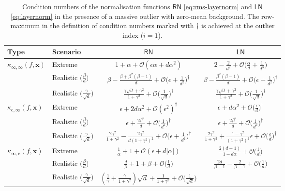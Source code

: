 \documentclass[namedate,webpdf,imanum]{ima-authoring-template}
\newcommand{\Layer}[1]{\mathsf{#1}}
\newcommand{\cond}[3][]{\kappa_{\mathrm{#2}} #1( #3 #1)}
\newcommand{\Oh}[2][]{\mathcal{O}#1( #2 #1)}
\numberwithin{equation}{section}
\begin{document}
\begin{table}[t]
\caption{Condition numbers of the normalisation functions $\Layer{RN}$ \eqref{eq:rms-layernorm} and $\Layer{LN}$ \eqref{eq:layernorm} in the presence of a massive outlier with zero-mean background.
The row-maximum in the definition of condition numbers marked with $\dagger$ is achieved at the outlier index ($i = 1$).}
\label{tab:rn_ln_zero_mean}
\begin{tabular}{@{}llcc@{}}
\toprule
Type & Scenario & $\Layer{RN}$ & $\Layer{LN}$ \\
\midrule
$\cond{\infty,\infty}{f,\mathbf{x}}$
& Extreme
& $1 + \alpha + \Oh{\epsilon\alpha + d \alpha^2}$
& $2 - \frac{2}{d^2} + \Oh[\Big]{\frac{\alpha}{d} + \frac{1}{d^3}}$ \\
%
& Realistic $\Big(\tfrac{\beta}{d}\Big)$
& $\beta - \frac{\beta + \beta^2(\beta - 1)}{d} + \Oh[\Big]{\epsilon + \frac{1}{d^2}}^\dagger$
& $\beta - \frac{\beta^2(\beta-1)}{d} + \Oh[\Big]{\epsilon + \frac{1}{d^2}}^\dagger$ \\
%
& Realistic $\Big(\tfrac{\gamma}{\sqrt{d}}\Big)$
& $\frac{\gamma\sqrt{d} + \gamma^2}{1+\gamma^2} + \Oh[\Big]{\frac{1}{\sqrt{d}}}^\dagger$
& $\frac{\gamma\sqrt{d} + \gamma^2}{1+\gamma^2} + \Oh[\Big]{\frac{1}{\sqrt{d}}}^\dagger$ \\
\midrule
$\cond{c,\infty}{f,\mathbf{x}}$
& Extreme
& $\epsilon + 2d\alpha^2 + \Oh{\epsilon^2}^\dagger$
& $\epsilon + d\alpha^2 + \Oh[\Big]{\frac{\epsilon}{d}}^\dagger$ \\
%
& Realistic $\Big(\tfrac{\beta}{d}\Big)$
& $\epsilon + \frac{2\beta^2}{d} + \Oh[\Big]{\frac{1}{d^2}}^\dagger$
& $\epsilon + \frac{2\beta^2}{d} + \Oh[\Big]{\frac{1}{d^2}}^\dagger$ \\
& Realistic $\Big(\tfrac{\gamma}{\sqrt{d}}\Big)$
& $\frac{2\gamma^2}{1+\gamma^2} - \frac{2\gamma^2}{d(1+\gamma^2)^2} + \Oh[\Big]{\epsilon + \frac{1}{d^2}}^\dagger$
& $\frac{2\gamma^2}{1+\gamma^2} + \frac{1 - \gamma^2}{(1+\gamma^2)^2}\epsilon + \Oh[\Big]{\frac{\epsilon}{d}}^\dagger$ \\
\midrule
$\cond{\infty,c}{f,\mathbf{x}}$
& Extreme
& $\frac{1}{\alpha} + 1 + \Oh{\epsilon + d|\alpha|}$
& $\frac{2(d-1)}{1-d\alpha} + \Oh[\Big]{\frac{1}{d}}$ \\
%
& Realistic $\Big(\tfrac{\beta}{d}\Big)$
& $\frac{d}{\beta} + 1 + \beta + \Oh[\Big]{\frac{1}{d}}$
& $\frac{2d}{\beta-1} - \frac{2}{\beta-1} + \Oh[\Big]{\frac{1}{d}}$ \\
%
& Realistic $\Big(\tfrac{\gamma}{\sqrt{d}}\Big)$
& $\left(\frac{1}{\gamma} + \frac{\gamma}{1+\gamma^2}\right)\sqrt{d} + \frac{1}{1+\gamma^2} + \Oh[\Big]{\frac{1}{\sqrt{d}}}$

\end{tabular}
\end{table}
\end{document}
